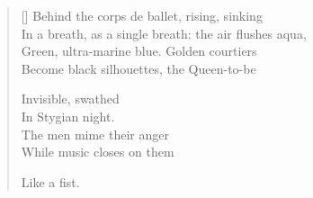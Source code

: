 \begin{verse}[\versewidth]
Behind the corps de ballet, rising, sinking\\
In a breath, as a single breath: the air flushes aqua,\\
Green, ultra-marine blue. Golden courtiers\\
Become black silhouettes, the Queen-to-be

Invisible, swathed\\
In Stygian night.\\
The men mime their anger\\
While music closes on them

Like a fist.
\end{verse}
